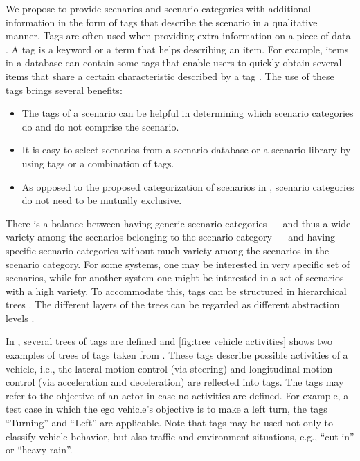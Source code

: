 We propose to provide scenarios and scenario categories with additional information in the form of tags that describe the scenario in a qualitative manner.
Tags are often used when providing extra information on a piece of data \autocite{smith2007tagging}. A tag is a keyword or a term that helps describing an item. For example, items in a database can contain some tags that enable users to quickly obtain several items that share a certain characteristic described by a tag \autocite{craft2004tagging}. 
The use of these tags brings several benefits:
\begin{itemize}
	\item The tags of a scenario can be helpful in determining which scenario categories do and do not comprise the scenario.
	\item It is easy to select scenarios from a scenario database or a scenario library by using tags or a combination of tags.
	\item As opposed to the proposed categorization of scenarios in \autocite{opdencamp2014cats, USDoT2007precrashscenarios, lenard2014typical, lara2019harmonized}, scenario categories do not need to be mutually exclusive.
\end{itemize}

There is a balance between having generic scenario categories --- and thus a wide variety among the scenarios belonging to the scenario category --- and having specific scenario categories without much variety among the scenarios in the scenario category. For some systems, one may be interested in very specific set of scenarios, while for another system one might be interested in a set of scenarios with a high variety. To accommodate this, tags can be structured in hierarchical trees \autocite{molloy2017dynamic}. The different layers of the trees can be regarded as different abstraction levels \autocite{Bonnin2014}. 

In \autocite{degelder2019scenariocategories}, several trees of tags are defined and \cref{fig:tree vehicle activities} shows two examples of trees of tags taken from \autocite{degelder2019scenariocategories}. These tags describe possible activities of a vehicle, i.e., the lateral motion control (via steering) and longitudinal motion control (via acceleration and deceleration) are reflected into tags. The tags may refer to the objective of an actor in case no activities are defined. For example, a test case in which the ego vehicle's objective is to make a left turn, the tags ``Turning'' and ``Left'' are applicable. Note that tags may be used not only to classify vehicle behavior, but also traffic and environment situations, e.g., ``cut-in'' or ``heavy rain''.

